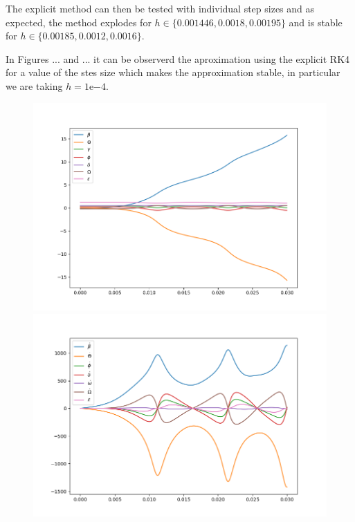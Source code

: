 \documentclass{report}
\begin{document}
The explicit method can then be tested with individual step sizes and as expected, the method explodes for $h \in \{0.001446, 0.0018, 0.00195\}$ and is stable for $h \in \{0.00185, 0.0012, 0.0016\}$.

In Figures ... and ... it can be observerd the aproximation using the explicit RK4 for a value of the stes size which makes the approximation stable, in particular we are taking $h=1\mathrm{e}{-4}$.

\begin{figure}[h]
\begin{minipage}[t]{0.4\textwidth}
\centering
\includegraphics[width=\textwidth]{../Plots/RK4_Proj2/angles.png}
\end{minipage}
\begin{minipage}[t]{0.4\textwidth}
\centering
\includegraphics[width=\textwidth]{../Plots/RK4_Proj2/derivatives.png}
\end{minipage}
\end{figure}
\end{document}
